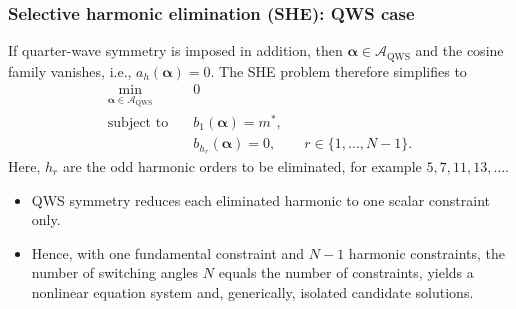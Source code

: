 \begin{frame}
    \frametitle{Selective harmonic elimination (SHE): QWS case}
    If quarter-wave symmetry is imposed in addition, then \(\bm{\alpha}\in\mathcal{A}_{\mathrm{QWS}}\) and the cosine family vanishes, i.e., \(a_h(\bm{\alpha})=0\). \pause The SHE problem therefore simplifies to
    \begin{equation}
        \begin{aligned}
            \min_{\bm{\alpha}\in\mathcal{A}_{\mathrm{QWS}}} \quad & 0                       \\
            \text{subject to} \quad                               & b_1(\bm{\alpha})=m^*,   \\
                                                                  & b_{h_r}(\bm{\alpha})=0,
            \qquad r\in\{1,\ldots,N-1\}.
        \end{aligned}
        \label{eq:general_she_qw_rev4}
    \end{equation}\pause
    Here, \(h_r\) are the odd harmonic orders to be eliminated, for example \(5,7,11,13,\ldots\). \pause

    \begin{itemize}
        \item QWS symmetry reduces each eliminated harmonic to one scalar constraint only.\pause
        \item Hence, with one fundamental constraint and \(N-1\) harmonic constraints, the number of switching angles \(N\) equals the number of constraints, yields a nonlinear equation system and, generically, isolated candidate solutions.
    \end{itemize}
\end{frame}

